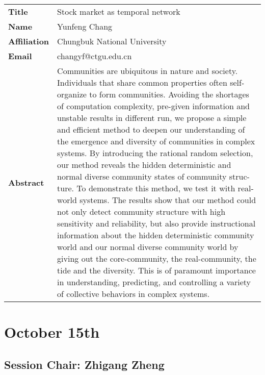 \documentclass[oneside,A4paper,12pt]{article}
\begin{document}
\newpage
\begin{longtable}{p{2cm}p{14cm}}
\toprule
\textbf{Title} & Stock market as temporal network\\
\textbf{Name} & Yunfeng Chang\\
\textbf{Affiliation} & Chungbuk National University\\
\textbf{Email} & changyf@ctgu.edu.cn\\
\textbf{Abstract} & Communities are ubiquitous in nature and society. Individuals that share common properties often self-organize to form communities. Avoiding the shortages of computation complexity, pre-given information and unstable results in different run, we propose a simple and efficient method to deepen our understanding of the emergence and diversity of communities in complex systems. By introducing the rational random selection, our method reveals the hidden deterministic and normal diverse community states of community struc- ture. To demonstrate this method, we test it with real-world systems. The results show that our method could not only detect community structure with high sensitivity and reliability, but also provide instructional information about the hidden deterministic community world and our normal diverse community world by giving out the core-community, the real-community, the tide and the diversity. This is of paramount importance in understanding, predicting, and controlling a variety of collective behaviors in complex systems.\\
\bottomrule
\end{longtable}


\newpage
\section*{October 15th}
\label{sec:org0a5f6da}

\subsection*{Session \uppercase\expandafter{}  \hspace{10mm} Chair: Zhigang Zheng}
\label{sec:org8e74fcb}
\end{document}
